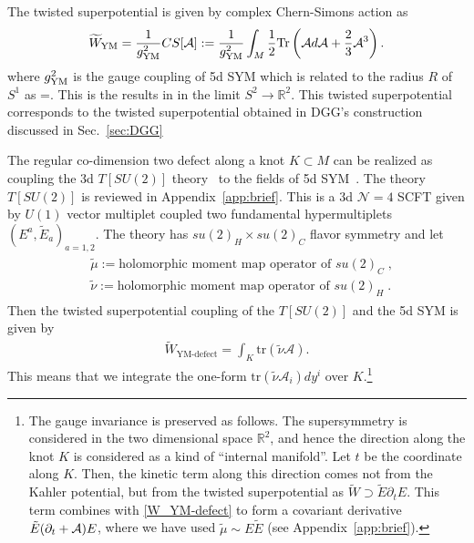 \documentclass[a4paper,11pt]{article}
\def\cA{\mathcal{A}}
\def\cN{\mathcal{N}}
\def\bR{\mathbb{R}}
\def\CA{{\cal A}}
\def\BR{{\mathbb R}}
\def\beq#1\eeq{\begin{align}#1\end{align}}
\begin{document}
The twisted superpotential is given by complex Chern-Simons action as
%
\begin{align}
\widetilde{W}_\text{YM} = \frac{1}{g_{\rm YM}^2} CS[\cA] :=\frac{1}{g_{\rm YM}^2} \int_M  \frac{1}{2} \mathrm{Tr} \left(  \cA d \cA +\frac{2}{3} \cA^3 \right). \label{W_YM}
\end{align}
where $g_{\rm YM}^2$ is the gauge coupling of 5d SYM which is related to the radius $R$ of $S^1$ as
\beq
\frac{1}{g_{\rm YM}^2 } =.
\eeq
%
This is the results in \cite{Yagi:2013fda,Lee:2013ida,Cordova:2013cea} in the limit $S^2 \to \bR^2$.
This twisted superpotential corresponds to the twisted superpotential obtained in DGG's construction discussed in Sec.~\ref{sec:DGG}

The regular co-dimension two defect along a knot  $K \subset M$ can be realized as coupling the 3d $T[SU(2)]$ theory~\cite{Gaiotto:2008ak} to the fields of
5d SYM~\cite{Benini:2009gi,Benini:2010uu,Gaiotto:2011xs,Chacaltana:2012zy,Yonekura:2013mya}.  
The  theory $T[SU(2)]$ is reviewed in Appendix~\ref{app:brief}. This
is a 3d $\cN=4$ SCFT given by $U(1)$ vector multiplet coupled two fundamental hypermultiplets $(E^a,\tilde{E}_a)_{a=1,2}$. 
The theory has $su(2)_H\times su(2)_C$  flavor symmetry and let 
%
\begin{align}
\begin{split}
&\widetilde{\mu} := \textrm{holomorphic moment map operator of $su(2)_C$}\;,
\\
&\widetilde{\nu}:= \textrm{holomorphic moment map operator of $su(2)_H$} \;.
\end{split}
\end{align}
%
Then the twisted superpotential coupling of the $T[SU(2)]$ and the 5d SYM is given by
%
\begin{align}
\widetilde{W}_\text{YM-defect} = \int_K \textrm{tr} (\widetilde{\nu} \cA). \label{W_YM-defect}
\end{align}
%
This means that we integrate the one-form $\textrm{tr}(\widetilde{\nu} \cA_i)dy^i$ over $K$.\footnote{
The gauge invariance is preserved as follows. The supersymmetry is considered in the two dimensional space $\BR^2$,
and hence the direction along the knot $K$ is considered as a kind of ``internal manifold''. Let $t$ be the coordinate along $K$.
Then, the kinetic term along this direction comes not from the Kahler potential, 
but from the twisted superpotential as $\widetilde{W} \supset \tilde{E} \partial_t E$.
This term combines with \eqref{W_YM-defect} to form a covariant derivative $\tilde{E}(\partial_t +\CA)E$,
where we have used $\widetilde{\mu} \sim E\tilde{E}$ (see Appendix~\ref{app:brief}).}
\end{document}

